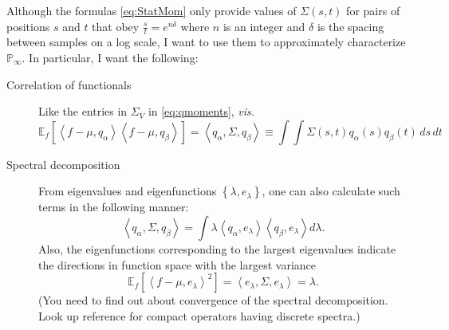 \documentclass[]{article}
\newcommand{\field}[1]{\mathbb{#1}}
\newcommand\Polytope[1]{\field{P}_{#1}}
\newcommand\PolytopeInf{\Polytope{\infty}}
\newcommand{\EV}[2]{\field{E}_{#1}\left[#2\right]}
\newcommand\inner[2]{\left<#1,#2\right>}
\begin{document}
Although the formulas \eqref{eq:StatMom} only provide values of
$\Sigma(s,t)$ for pairs of positions $s$ and $t$ that obey
$\frac{s}{t} = e^{n\delta}$ where $n$ is an integer and $\delta$ is
the spacing between samples on a log scale, I want to use them to
approximately characterize $\PolytopeInf$.  In particular, I want the
following:
\begin{description}
\item[Correlation of functionals] Like the entries in $\Sigma_V$ in
  \eqref{eq:qmoments}, \emph{vis.}
  \begin{equation}
    \label{eq:corr}
   \EV{f}{\inner{f-\mu}{q_\alpha}\inner{f-\mu}{q_\beta}} =
   \inner{q_\alpha, \Sigma}{q_\beta} \equiv \int\int \Sigma(s,t)
   q_\alpha(s) q_\beta(t) \,ds \,dt
\end{equation}
\item[Spectral decomposition] From eigenvalues and eigenfunctions
  $\left\{\lambda, e_\lambda \right\}$, one can also calculate such
  terms in the following manner:
  \begin{equation}
    \label{eq:spec1}
    \inner{q_\alpha, \Sigma}{q_\beta} = \int \lambda
    \inner{q_\alpha}{e_\lambda} \inner{q_\beta}{e_\lambda} d\lambda.
  \end{equation}
  Also, the eigenfunctions corresponding to the largest eigenvalues
  indicate the directions in function space with the largest variance
  \begin{equation}
    \label{eq:spec2}
    \EV{f}{\inner{f-\mu}{e_\lambda}^2} = \inner{e_\lambda, \Sigma }{
      e_\lambda } = \lambda.
  \end{equation}
  (You need to find out about convergence of the spectral
  decomposition.  Look up reference for compact operators having
  discrete spectra.)
\end{description}
\end{document}
